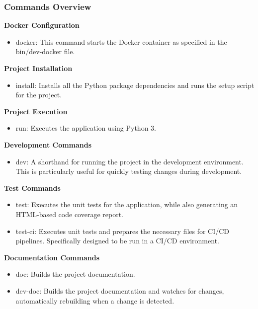 \subsubsection{Commands Overview}\label{commands-overview}

\textbf{Docker Configuration}

\begin{itemize}
\item
  docker: This command starts the Docker container as specified in the
  bin/dev-docker file.
\end{itemize}

\textbf{Project Installation}

\begin{itemize}
\item
  install: Installs all the Python package dependencies and runs the
  setup script for the project.
\end{itemize}

\textbf{Project Execution}

\begin{itemize}
\item
  run: Executes the application using Python 3.
\end{itemize}

\textbf{Development Commands}

\begin{itemize}
\item
  dev: A shorthand for running the project in the development
  environment. This is particularly useful for quickly testing changes
  during development.
\end{itemize}

\textbf{Test Commands}

\begin{itemize}
\item
  test: Executes the unit tests for the application, while also
  generating an HTML-based code coverage report.
\item
  test-ci: Executes unit tests and prepares the necessary files for
  CI/CD pipelines. Specifically designed to be run in a CI/CD
  environment.
\end{itemize}

\textbf{Documentation Commands}

\begin{itemize}
\item
  doc: Builds the project documentation.
\item
  dev-doc: Builds the project documentation and watches for changes,
  automatically rebuilding when a change is detected.
\end{itemize}

